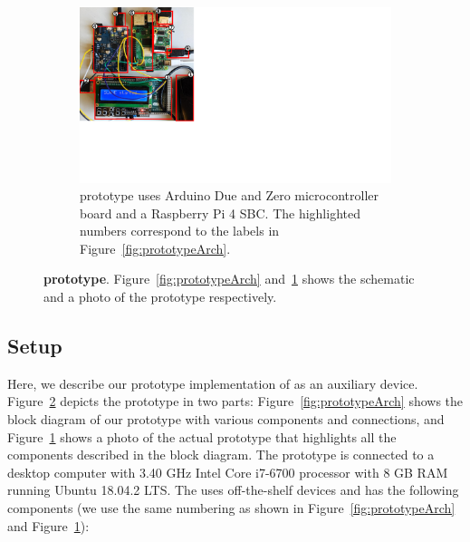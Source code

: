 \begin{figure}[!htpb]
    \begin{center}
        \begin{subfigure}{\textwidth}
        \centering
        \includegraphics[trim={0 6.6cm 21.5cm 0}, clip, scale=0.55]{chapters/ProtectIOn/images/setUp_1.pdf}
        \caption{\name \device prototype uses Arduino Due and Zero microcontroller board and a Raspberry Pi 4 SBC. The highlighted numbers correspond to the labels in Figure~\ref{fig:prototypeArch}.}
        \label{fig:prototype_protection}
    \end{subfigure}
    \end{center}
   
    \caption[\name prototype]{\textbf{\name prototype}. Figure~\ref{fig:prototypeArch} and~\ref{fig:prototype_protection} shows the schematic and a photo of the  \name \device prototype respectively.} 
    \label{fig:prototypeAll}
\end{figure}


\subsection{Setup} Here, we describe our prototype implementation of \name as an auxiliary device. Figure~\ref{fig:prototypeAll} depicts the \name prototype in two parts: Figure~\ref{fig:prototypeArch} shows the block diagram of our prototype with various components and connections, and Figure~\ref{fig:prototype_protection} shows a photo of the actual prototype that highlights all the components described in the block diagram. The prototype \device is connected to a desktop computer with 3.40 GHz Intel Core i7-6700 processor with 8 GB RAM running Ubuntu 18.04.2 LTS. The \device uses off-the-shelf devices and has the following components (we use the same numbering as shown in Figure~\ref{fig:prototypeArch} and Figure~\ref{fig:prototype_protection}):

